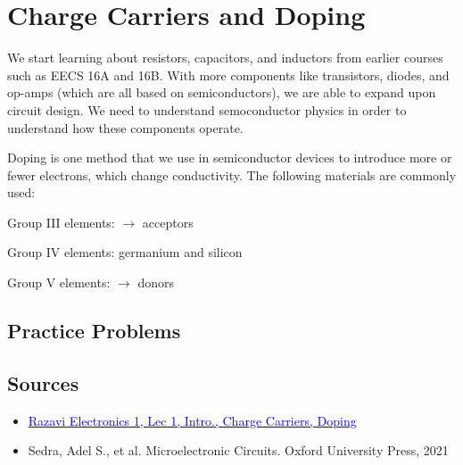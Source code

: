 \section{Charge Carriers and Doping}
We start learning about resistors, capacitors, and inductors from earlier courses such as EECS 16A and 16B. With more components like transistors, diodes, and op-amps (which are all based on semiconductors), we are able to expand upon circuit design. We need to understand semoconductor physics in order to understand how these components operate.
\begin{center}
\end{center}


Doping is one method that we use in semiconductor devices to introduce more or fewer electrons, which change conductivity. The following materials are commonly used:
\begin{pline}
    \item Group III elements: $\rightarrow$ acceptors
    \item Group IV elements: germanium and silicon
    \item Group V elements: $\rightarrow$ donors
\end{pline}

\subsection{Practice Problems}

\subsection{Sources}
\begin{itemize}
    \item \href{https://www.youtube.com/watch?v=yQDfVJzEymI}{\textcolor{blue}{Razavi Electronics 1, Lec 1, Intro., Charge Carriers, Doping}}
    \item Sedra, Adel S., et al. Microelectronic Circuits. Oxford University Press, 2021
\end{itemize}

